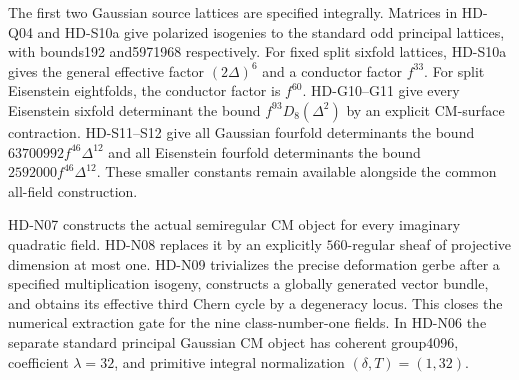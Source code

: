 The first two Gaussian source lattices are specified integrally.
Matrices in HD-Q04 and HD-S10a give polarized isogenies to the standard
odd principal lattices, with bounds192 and5971968 respectively.
For fixed split sixfold lattices, HD-S10a gives the general effective
factor $(2\Delta)^6$ and a conductor factor $f^{33}$.
For split Eisenstein eightfolds, the conductor factor is $f^{60}$.
HD-G10--G11 give every Eisenstein sixfold determinant the bound
$f^{93}D_8(\Delta^2)$ by an explicit CM-surface contraction.
HD-S11--S12 give all Gaussian fourfold determinants the bound
$63700992f^{46}\Delta^{12}$ and all Eisenstein fourfold determinants
the bound $2592000f^{46}\Delta^{12}$. These smaller constants remain
available alongside the common all-field construction.

HD-N07 constructs the actual semiregular CM object for every
imaginary quadratic field. HD-N08 replaces it by an explicitly
$560$-regular sheaf of projective dimension at most one. HD-N09
trivializes the precise deformation gerbe after a specified
multiplication isogeny, constructs a globally generated vector
bundle, and obtains its effective third Chern cycle by a degeneracy
locus. This closes the numerical extraction gate for the nine
class-number-one fields. In HD-N06 the separate standard principal
Gaussian CM object has coherent group4096, coefficient $\lambda=32$,
and primitive integral normalization $(\delta,T)=(1,32)$.

